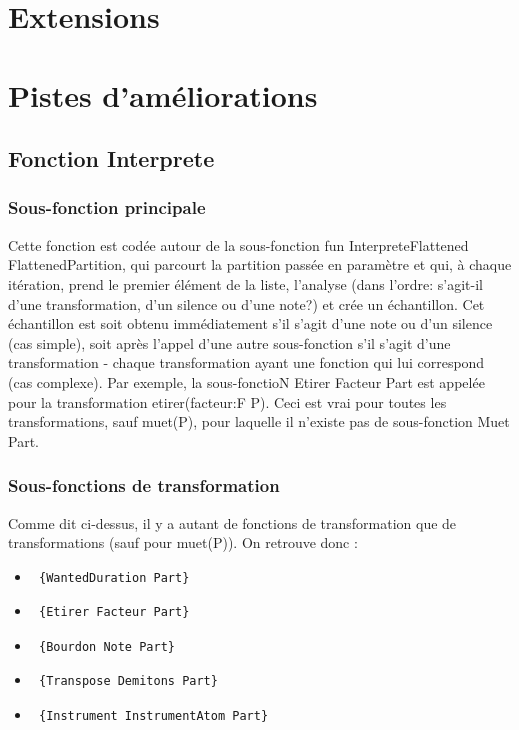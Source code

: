 \documentclass[10pt,a4paper]{article}
\begin{document}
\section{Extensions}



\section{Pistes d'améliorations}


\newpage



\subsection{Fonction Interprete}
\subsubsection{Sous-fonction principale}
Cette fonction est codée autour de la sous-fonction fun {InterpreteFlattened FlattenedPartition},
 qui parcourt la partition passée en paramètre et qui, à chaque itération, prend le premier
élément de la liste, l'analyse (dans l'ordre: s'agit-il d'une transformation, d'un silence ou d'une note?)
 et crée un échantillon. Cet échantillon est soit obtenu immédiatement s'il s'agit d'une note ou d'un
silence (cas simple), soit après l'appel d'une autre sous-fonction s'il s'agit d'une transformation -
chaque transformation ayant une fonction qui lui correspond (cas complexe). Par exemple, la sous-fonctioN
{Etirer Facteur Part} est appelée pour la transformation etirer(facteur:F P). Ceci est vrai pour toutes
les transformations, sauf muet(P), pour laquelle il n'existe pas de sous-fonction {Muet Part}.

\subsubsection{Sous-fonctions de transformation}
Comme dit ci-dessus, il y a autant de fonctions de transformation que de transformations (sauf pour muet(P)). 
On retrouve donc :
\begin{itemize}
	\item \begin{verbatim} {WantedDuration Part} \end{verbatim}
	\item \begin{verbatim} {Etirer Facteur Part} \end{verbatim}
	\item \begin{verbatim} {Bourdon Note Part} \end{verbatim}
	\item \begin{verbatim} {Transpose Demitons Part} \end{verbatim}
	\item \begin{verbatim} {Instrument InstrumentAtom Part} \end{verbatim} 
\end{itemize}
\end{document}
